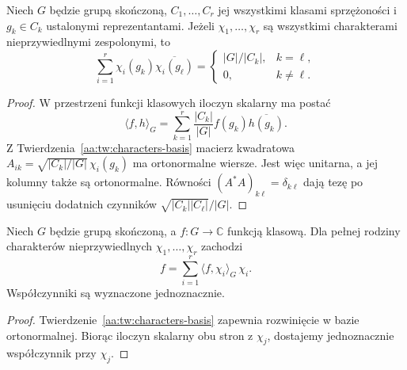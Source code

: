 \begin{wniosek}
\label{aa:cor:column-orthogonality}
Niech \(G\) będzie grupą skończoną,
\(C_1,\ldots,C_r\) jej wszystkimi klasami sprzężoności
i \(g_k\in C_k\) ustalonymi reprezentantami.
Jeżeli \(\chi_1,\ldots,\chi_r\) są wszystkimi
charakterami nieprzywiedlnymi zespolonymi, to
\[
\sum_{i=1}^r\chi_i(g_k)\overline{\chi_i(g_\ell)}
=\begin{cases}
|G|/|C_k|,&k=\ell,\\
0,&k\ne\ell.
\end{cases}
\]
\end{wniosek}
\begin{proof}
W przestrzeni funkcji klasowych iloczyn skalarny ma
postać
\[
\langle f,h\rangle_G
=\sum_{k=1}^r\frac{|C_k|}{|G|}f(g_k)\overline{h(g_k)}.
\]
Z Twierdzenia~\ref{aa:tw:characters-basis}
macierz kwadratowa
\(A_{ik}=\sqrt{|C_k|/|G|}\,\chi_i(g_k)\)
ma ortonormalne wiersze. Jest więc unitarna,
a jej kolumny także są ortonormalne.
Równości \((A^*A)_{k\ell}=\delta_{k\ell}\)
dają tezę po usunięciu dodatnich czynników
\(\sqrt{|C_k||C_\ell|}/|G|\).
\end{proof}

\begin{wniosek}
\label{aa:cor:class-fourier}
Niech \(G\) będzie grupą skończoną, a
\(f:G\to\mathbb C\) funkcją klasową.
Dla pełnej rodziny charakterów
nieprzywiedlnych \(\chi_1,\ldots,\chi_r\) zachodzi
\[
f=\sum_{i=1}^r\langle f,\chi_i\rangle_G\,\chi_i.
\]
Współczynniki są wyznaczone jednoznacznie.
\end{wniosek}
\begin{proof}
Twierdzenie~\ref{aa:tw:characters-basis} zapewnia
rozwinięcie w bazie ortonormalnej. Biorąc iloczyn
skalarny obu stron z \(\chi_j\), dostajemy
jednoznacznie współczynnik przy \(\chi_j\).
\end{proof}

